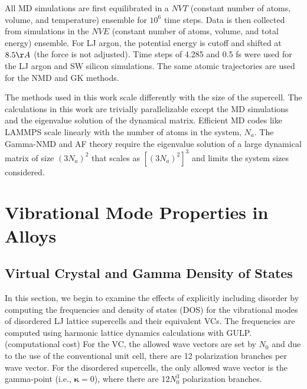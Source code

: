 \documentclass[aps,prb,onecolumn,preprint,footinbib,superscriptaddress,amsmath,amssymb,floatfix]{revtex4}
\begin{document}
All MD simulations are first equilibrated in a $NVT$ (constant 
number of atoms, volume, and temperature) ensemble for 
$10^6$ time steps. Data is then collected from simulations in the $NVE$ 
(constant number of 
atoms, volume, and total energy) ensemble. For LJ argon, the potential 
energy is cutoff and shifted at $8.5 \AA$ (the force is not adjusted). 
Time steps of 4.285 and 0.5 fs were used for the LJ argon and 
SW silicon simulations. The same atomic trajectories are used for the 
NMD and GK methods. 

The methods used 
in this work scale differently with the size of the supercell. 
The calculations in this work are trivially parallelizable except the 
MD simulations\cite{plimpton_fast_1995} and the eigenvalue solution of the 
dynamical matrix.\cite{gale_general_2003} Efficient MD 
codes like LAMMPS scale linearly with the number of atoms in 
the system, $N_a$. The Gamma-NMD and AF theory 
require the eigenvalue solution of a large dynamical matrix of size 
$(3N_a)^2$ that scales as $[(3N_a)^2]^3$ and limits the system 
sizes considered.\cite{gale_general_2003} 

\section{\label{S:Vibrational}
Vibrational Mode Properties in Alloys}

\subsection{\label{S:VC Gamma DOS}Virtual Crystal and Gamma Density of 
States}

In this section, we begin to examine the effects of explicitly including 
disorder by computing the frequencies and density of states (DOS)  
for the vibrational modes of disordered LJ lattice supercells and their 
equivalent VCs. The frequencies 
are computed using harmonic lattice dynamics calculations with  
GULP.\cite{gale_general_2003} (computational cost) For the 
VC, the allowed wave vectors are set by $N_0$ and due to the use of the 
conventional unit cell, there are 12 
polarization branches per wave vector.  
For the disordered supercells,
the only allowed wave vector is the gamma-point (i.e., $\pmb{\kappa}=0$),  
where there are 12$N_0^3$ polarization branches. 
\end{document}
